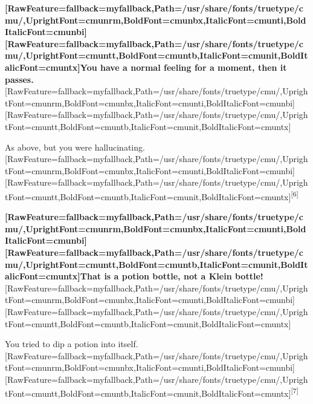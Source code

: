 {\bfseries \allowbreak{}\setmainfont{cmunbx.ttf}[RawFeature={fallback=myfallback},Path=/usr/share/fonts/truetype/cmu/,UprightFont=cmunrm,BoldFont=cmunbx,ItalicFont=cmunti,BoldItalicFont=cmunbi]\setmonofont{cmunbx.ttf}[RawFeature={fallback=myfallback},Path=/usr/share/fonts/truetype/cmu/,UprightFont=cmuntt,BoldFont=cmuntb,ItalicFont=cmunit,BoldItalicFont=cmuntx]\bfseries You have a normal feeling for a moment, then it passes.}\allowbreak{}\setmainfont{cmunrm.ttf}[RawFeature={fallback=myfallback},Path=/usr/share/fonts/truetype/cmu/,UprightFont=cmunrm,BoldFont=cmunbx,ItalicFont=cmunti,BoldItalicFont=cmunbi]\setmonofont{cmunrm.ttf}[RawFeature={fallback=myfallback},Path=/usr/share/fonts/truetype/cmu/,UprightFont=cmuntt,BoldFont=cmuntb,ItalicFont=cmunit,BoldItalicFont=cmuntx]

\begin{myquote}
\item{}As above, but you were hallucinating\footnotemark[257].\allowbreak{}\setmainfont{cmunrm.ttf}[RawFeature={fallback=myfallback},Path=/usr/share/fonts/truetype/cmu/,UprightFont=cmunrm,BoldFont=cmunbx,ItalicFont=cmunti,BoldItalicFont=cmunbi]\setmonofont{cmunrm.ttf}[RawFeature={fallback=myfallback},Path=/usr/share/fonts/truetype/cmu/,UprightFont=cmuntt,BoldFont=cmuntb,ItalicFont=cmunit,BoldItalicFont=cmuntx]\textsuperscript{{$\text{[}$}6{$\text{]}$}}
\end{myquote}

{\bfseries \allowbreak{}\setmainfont{cmunbx.ttf}[RawFeature={fallback=myfallback},Path=/usr/share/fonts/truetype/cmu/,UprightFont=cmunrm,BoldFont=cmunbx,ItalicFont=cmunti,BoldItalicFont=cmunbi]\setmonofont{cmunbx.ttf}[RawFeature={fallback=myfallback},Path=/usr/share/fonts/truetype/cmu/,UprightFont=cmuntt,BoldFont=cmuntb,ItalicFont=cmunit,BoldItalicFont=cmuntx]\bfseries That is a potion bottle, not a Klein bottle!}\allowbreak{}\setmainfont{cmunrm.ttf}[RawFeature={fallback=myfallback},Path=/usr/share/fonts/truetype/cmu/,UprightFont=cmunrm,BoldFont=cmunbx,ItalicFont=cmunti,BoldItalicFont=cmunbi]\setmonofont{cmunrm.ttf}[RawFeature={fallback=myfallback},Path=/usr/share/fonts/truetype/cmu/,UprightFont=cmuntt,BoldFont=cmuntb,ItalicFont=cmunit,BoldItalicFont=cmuntx]

\begin{myquote}
\item{}You tried to dip a potion into itself.\allowbreak{}\setmainfont{cmunrm.ttf}[RawFeature={fallback=myfallback},Path=/usr/share/fonts/truetype/cmu/,UprightFont=cmunrm,BoldFont=cmunbx,ItalicFont=cmunti,BoldItalicFont=cmunbi]\setmonofont{cmunrm.ttf}[RawFeature={fallback=myfallback},Path=/usr/share/fonts/truetype/cmu/,UprightFont=cmuntt,BoldFont=cmuntb,ItalicFont=cmunit,BoldItalicFont=cmuntx]\textsuperscript{{$\text{[}$}7{$\text{]}$}}
\end{myquote}

